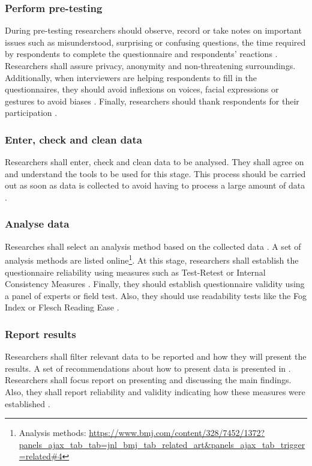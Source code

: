 \subsubsection{Perform pre-testing}
During pre-testing researchers should observe, record or take notes on important issues such as misunderstood, surprising or confusing questions, the time required by respondents to complete the questionnaire and respondents' reactions \autocite{Boynton2004}. Researchers shall assure privacy, anonymity and non-threatening surroundings. Additionally, when interviewers are helping respondents to fill in the questionnaires, they should avoid inflexions on voices, facial expressions or gestures to avoid biases \autocite{Boynton2004b}.
Finally, researchers should thank respondents for their participation \autocite{Diem}.

\subsubsection{Enter, check and clean data}
Researchers shall enter, check and clean data to be analysed. They shall agree on and understand the tools to be used for this stage. This process should be carried out as soon as data is collected to avoid having to process a large amount of data \autocite{Boynton2004}.

\subsubsection{Analyse data}
Researches shall select an analysis method based on the collected data \autocite{Boynton2004,Diem}. A set of analysis methods are listed online\footnote{Analysis methods: \url{https://www.bmj.com/content/328/7452/1372?panels_ajax_tab_tab=jnl_bmj_tab_related_art&panels_ajax_tab_trigger=related\#4}}. At this stage, researchers shall establish the questionnaire reliability using measures such as Test-Retest or Internal Consistency Measures \autocite{Radhakrishna2007,Diem}. Finally, they should establish questionnaire validity using a panel of experts or field test. Also, they should use readability tests like the Fog Index or Flesch Reading Ease \autocite{Radhakrishna2007}.

\subsubsection{Report results}
Researchers shall filter relevant data to be reported \autocite{Boynton2004,Diem} and how they will present the results. A set of recommendations about how to present data is presented in \autocite{Boynton2004}. Researchers shall focus report on presenting and discussing the main findings. Also, they shall report reliability and validity indicating how these measures were established \autocite{Radhakrishna2007}.

